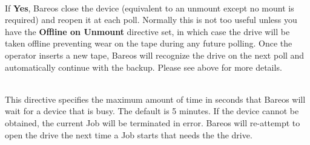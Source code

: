 \begin{description}

\item [Close on Poll= {\textless}yes{\textbar}no{\textgreater}] \hfill \\
If {\bf Yes}, Bareos close the device (equivalent to  an unmount except no
mount is required) and reopen it at each  poll. Normally this is not too
useful unless you have the  {\bf Offline on Unmount} directive set, in which
case the  drive will be taken offline preventing wear on the tape  during any
future polling. Once the operator inserts a new  tape, Bareos will recognize
the drive on the next poll and  automatically continue with the backup.
Please see above for more details.

\item [Maximum Open Wait = {\textless}time{\textgreater}] \hfill \\
This directive specifies the maximum amount of time in seconds that
Bareos will wait for a device that is busy.  The default is 5 minutes.
If the device cannot be obtained, the current Job will be terminated in
error.  Bareos will re-attempt to open the drive the next time a Job
starts that needs the the drive.


\end{description}
